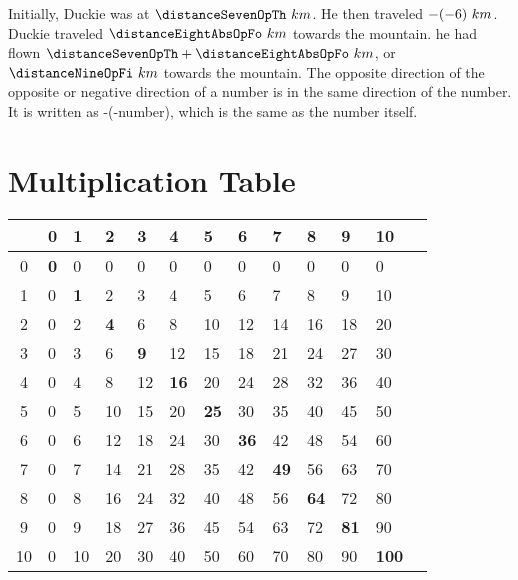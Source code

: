 {Initially, Duckie was at $\distanceSevenOpTh~km$. He then traveled $-(-6)~km$. Duckie traveled $\distanceEightAbsOpFo~km$ towards the mountain. he had flown $\distanceSevenOpTh+\distanceEightAbsOpFo~km$, or $\distanceNineOpFi~km$ towards the mountain.}
{The opposite direction of the opposite or negative direction of a number is in the same direction of the number. It is written as -(-number), which is the same as the number itself.}
{}
\section{Multiplication Table}
\begin{table}[h]
\centering
\begin{tabular}{c| llllllllllll}
   & 0          & 1          & 2          & 3          & 4           & 5           & 6           & 7           & 8           & 9           & 10            \\
   \hline
0  & \textbf{0} & 0          & 0          & 0          & 0           & 0           & 0           & 0           & 0           & 0           & 0             \\
1  & 0          & \textbf{1} & 2          & 3          & 4           & 5           & 6           & 7           & 8           & 9           & 10            \\
2  & 0          & 2          & \textbf{4} & 6          & 8           & 10          & 12          & 14          & 16          & 18          & 20            \\
3  & 0          & 3          & 6          & \textbf{9} & 12          & 15          & 18          & 21          & 24          & 27          & 30            \\
4  & 0          & 4          & 8          & 12         & \textbf{16} & 20          & 24          & 28          & 32          & 36          & 40            \\
5  & 0          & 5          & 10         & 15         & 20          & \textbf{25} & 30          & 35          & 40          & 45          & 50            \\
6  & 0          & 6          & 12         & 18         & 24          & 30          & \textbf{36} & 42          & 48          & 54          & 60            \\
7  & 0          & 7          & 14         & 21         & 28          & 35          & 42          & \textbf{49} & 56          & 63          & 70            \\
8  & 0          & 8          & 16         & 24         & 32          & 40          & 48          & 56          & \textbf{64} & 72          & 80            \\
9  & 0          & 9          & 18         & 27         & 36          & 45          & 54          & 63          & 72          & \textbf{81} & 90            \\
10 & 0          & 10         & 20         & 30         & 40          & 50          & 60          & 70          & 80          & 90          & \textbf{100} 
\end{tabular}
\end{table}
